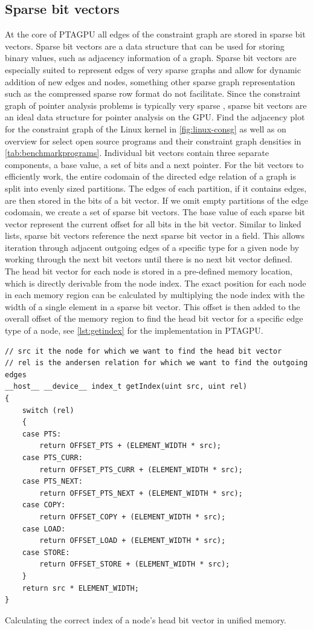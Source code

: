 \subsection{Sparse bit vectors}
At the core of PTAGPU all edges of the constraint graph are stored in sparse bit vectors.
Sparse bit vectors are a data structure that can be used for storing binary values, such as adjacency information of a graph. Sparse bit vectors are especially suited to represent edges of very sparse graphs and allow for dynamic addition of new edges and nodes, something other sparse graph representation such as the compressed sparse row format do not facilitate. Since the constraint graph of pointer analysis problems is typically very sparse \cite{mendez2012gpu}, sparse bit vectors are an ideal data structure for pointer analysis on the GPU. Find the adjacency plot for the constraint graph of the Linux kernel in \autoref{fig:linux-consg} as well as on overview for select open source programs and their constraint graph densities in \autoref{tab:benchmarkprograms}.
Individual bit vectors contain three separate components, a base value, a set of bits and a next pointer.
For the bit vectors to efficiently work, the entire codomain of the directed edge relation of a graph is split into evenly sized partitions.
The edges of each partition, if it contains edges, are then stored in the bits of a bit vector. If we omit empty partitions of the edge codomain, we create a set of sparse bit vectors.
The base value of each sparse bit vector represent the current offset for all bits in the bit vector.
Similar to linked lists, sparse bit vectors reference the next sparse bit vector in a field. This allows iteration through adjacent outgoing edges of a specific type for a given node by working through the next bit vectors until there is no next bit vector defined.
The head bit vector for each node is stored in a pre-defined memory location, which is directly derivable from the node index.
The exact position for each node in each memory region can be calculated by multiplying the node index with the width of a single element in a sparse bit vector. This offset is then added to the overall offset of the memory region to find the head bit vector for a specific edge type of a node, see \autoref{lst:getindex} for the implementation in PTAGPU.
\begin{listing}
    \begin{verbatim}
// src it the node for which we want to find the head bit vector
// rel is the andersen relation for which we want to find the outgoing edges
__host__ __device__ index_t getIndex(uint src, uint rel)
{
    switch (rel)
    {
    case PTS:
        return OFFSET_PTS + (ELEMENT_WIDTH * src);
    case PTS_CURR:
        return OFFSET_PTS_CURR + (ELEMENT_WIDTH * src);
    case PTS_NEXT:
        return OFFSET_PTS_NEXT + (ELEMENT_WIDTH * src);
    case COPY:
        return OFFSET_COPY + (ELEMENT_WIDTH * src);
    case LOAD:
        return OFFSET_LOAD + (ELEMENT_WIDTH * src);
    case STORE:
        return OFFSET_STORE + (ELEMENT_WIDTH * src);
    }
    return src * ELEMENT_WIDTH;
}
    \end{verbatim}
    \caption{Calculating the correct index of a node's head bit vector in unified memory.}
    \label{lst:getindex}
\end{listing}
